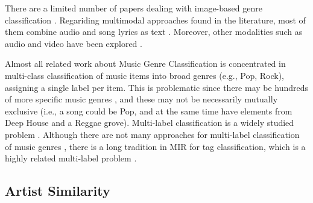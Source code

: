 There are a limited number of papers dealing with image-based genre classification \citep{libeks2011you}.
Regariding multimodal approaches found in the literature, most of them combine audio and song lyrics as text \citep{laurier2008multimodal,neumayer2007integration}. Moreover, other modalities such as audio and video have been explored \citep{schindler2015audio}. 

Almost all related work about Music Genre Classification is concentrated in multi-class classification of music items into broad genres (e.g., Pop, Rock), assigning a single label per item. This is problematic since there may be hundreds of more specific music genres \citep{pachet2000taxonomy}, and these may not be necessarily mutually exclusive (i.e., a song could be Pop, and at the same time have elements from Deep House and a Reggae grove). 
Multi-label classification is a widely studied problem \citep{tsoumakas2006multi,jain2016extreme}. 
Although there are not many approaches for multi-label classification of music genres \citep{Sanden2011,wang2009tag}, there is a long tradition in MIR for tag classification, which is a highly related multi-label problem \citep{Choi2016,wang2009tag}.


\subsection{Artist Similarity}
\label{sec:SOA:mir:similarity}

